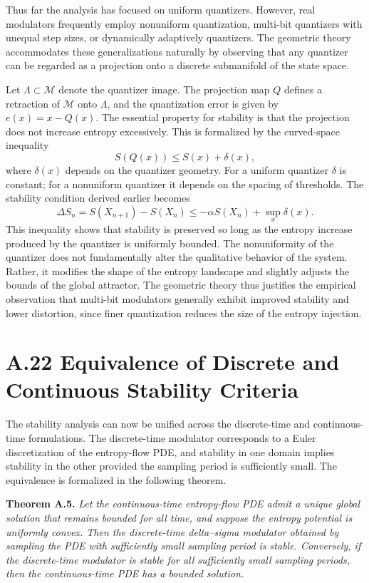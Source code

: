 Thus far the analysis has focused on uniform quantizers. However, real modulators frequently employ nonuniform quantization, multi-bit quantizers with unequal step sizes, or dynamically adaptively quantizers. The geometric theory accommodates these generalizations naturally by observing that any quantizer can be regarded as a projection onto a discrete submanifold of the state space.

Let \(\Lambda \subset \mathcal{M}\) denote the quantizer image. The projection map \(Q\) defines a retraction of \(\mathcal{M}\) onto \(\Lambda\), and the quantization error is given by \(e(x) = x - Q(x)\). The essential property for stability is that the projection does not increase entropy excessively. This is formalized by the curved-space inequality
\[
S(Q(x)) \le S(x) + \delta(x),
\]
where \(\delta(x)\) depends on the quantizer geometry. For a uniform quantizer \(\delta\) is constant; for a nonuniform quantizer it depends on the spacing of thresholds. The stability condition derived earlier becomes
\[
\Delta S_n = S(X_{n+1}) - S(X_n) \le -\alpha S(X_n) + \sup_x \delta(x).
\]
This inequality shows that stability is preserved so long as the entropy increase produced by the quantizer is uniformly bounded. The nonuniformity of the quantizer does not fundamentally alter the qualitative behavior of the system. Rather, it modifies the shape of the entropy landscape and slightly adjusts the bounds of the global attractor. The geometric theory thus justifies the empirical observation that multi-bit modulators generally exhibit improved stability and lower distortion, since finer quantization reduces the size of the entropy injection.

\section{A.22 Equivalence of Discrete and Continuous Stability Criteria}

The stability analysis can now be unified across the discrete-time and continuous-time formulations. The discrete-time modulator corresponds to a Euler discretization of the entropy-flow PDE, and stability in one domain implies stability in the other provided the sampling period is sufficiently small. The equivalence is formalized in the following theorem.

\medskip

\textbf{Theorem A.5.}
\emph{Let the continuous-time entropy-flow PDE admit a unique global solution that remains bounded for all time, and suppose the entropy potential is uniformly convex. Then the discrete-time delta–sigma modulator obtained by sampling the PDE with sufficiently small sampling period is stable. Conversely, if the discrete-time modulator is stable for all sufficiently small sampling periods, then the continuous-time PDE has a bounded solution.}

